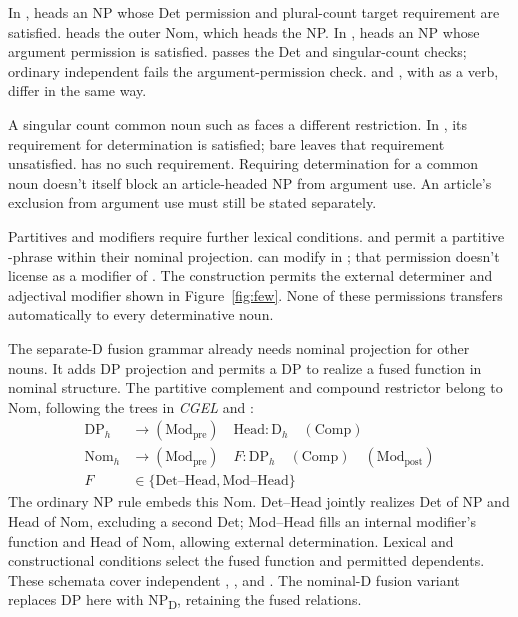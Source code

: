 \documentclass[12pt]{article}
\begin{document}
In ,  heads an NP whose Det permission and plural-count target requirement are satisfied.  heads the outer Nom, which heads the NP. In ,  heads an NP whose argument permission is satisfied.  passes the Det and singular-count checks; ordinary independent  fails the argument-permission check.  and , with  as a verb, differ in the same way.

A singular count common noun such as  faces a different restriction. In , its requirement for determination is satisfied; bare  leaves that requirement unsatisfied.  has no such requirement. Requiring determination for a common noun doesn't itself block an article-headed NP from argument use. An article's exclusion from argument use must still be stated separately.

Partitives and modifiers require further lexical conditions.  and  permit a partitive -phrase within their nominal projection.  can modify  in ; that permission doesn't license  as a modifier of . The construction  permits the external determiner and adjectival modifier shown in Figure~\ref{fig:few}. None of these permissions transfers automatically to every determinative noun.

The separate-D fusion grammar already needs nominal projection for other nouns. It adds DP projection and permits a DP to realize a fused function in nominal structure. The partitive complement and compound restrictor belong to Nom, following the trees in \textit{CGEL} and \textcite[582]{Payne2007}:
\[
\begin{aligned}
\mathrm{DP}_{h} &\to (\mathrm{Mod}_{\mathrm{pre}})\quad \mathrm{Head}:\mathrm{D}_{h}\quad (\mathrm{Comp}) \\
\mathrm{Nom}_{h} &\to (\mathrm{Mod}_{\mathrm{pre}})\quad F:\mathrm{DP}_{h}\quad (\mathrm{Comp})\quad (\mathrm{Mod}_{\mathrm{post}}) \\
F&\in\{\mathrm{Det\text{--}Head},\mathrm{Mod\text{--}Head}\}
\end{aligned}
\]
The ordinary NP rule embeds this Nom. Det--Head jointly realizes Det of NP and Head of Nom, excluding a second Det; Mod--Head fills an internal modifier's function and Head of Nom, allowing external determination. Lexical and constructional conditions select the fused function and permitted dependents. These schemata cover independent , ,  and . The nominal-D fusion variant replaces DP here with NP\textsubscript{D}, retaining the fused relations.
\end{document}
